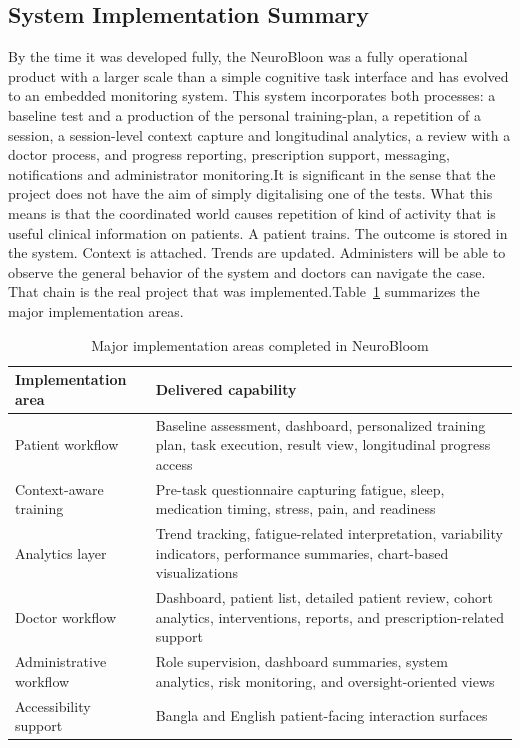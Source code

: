 \documentclass[12pt,a4paper]{report}
\begin{document}
\subsection{System Implementation Summary}
By the time it was developed fully, the NeuroBloon was a fully operational product with a larger scale than a simple cognitive task interface and has evolved to an embedded monitoring system. This system incorporates both processes: a baseline test and a production of the personal training-plan, a repetition of a session, a session-level context capture and longitudinal analytics, a review with a doctor process, and progress reporting, prescription support, messaging, notifications and administrator monitoring.It is significant in the sense that the project does not have the aim of simply digitalising one of the tests. What this means is that the coordinated world causes repetition of kind of activity that is useful clinical information on patients. A patient trains. The outcome is stored in the system. Context is attached. Trends are updated. Administers will be able to observe the general behavior of the system and doctors can navigate the case. That chain is the real project that was implemented.Table~\ref{tab:chapter4_implementation_summary} summarizes the major implementation areas.

\begin{table}[htbp]
\centering
\caption{Major implementation areas completed in NeuroBloom}
\label{tab:chapter4_implementation_summary}
\begin{tabularx}{\textwidth}{|p{3.7cm}|X|}
\hline
\textbf{Implementation area} & \textbf{Delivered capability} \\
\hline
Patient workflow & Baseline assessment, dashboard, personalized training plan, task execution, result view, longitudinal progress access \\
\hline
Context-aware training & Pre-task questionnaire capturing fatigue, sleep, medication timing, stress, pain, and readiness \\
\hline
Analytics layer & Trend tracking, fatigue-related interpretation, variability indicators, performance summaries, chart-based visualizations \\
\hline
Doctor workflow & Dashboard, patient list, detailed patient review, cohort analytics, interventions, reports, and prescription-related support \\
\hline
Administrative workflow & Role supervision, dashboard summaries, system analytics, risk monitoring, and oversight-oriented views \\
\hline
Accessibility support & Bangla and English patient-facing interaction surfaces \\
\hline
\end{tabularx}
\end{table}
\end{document}
